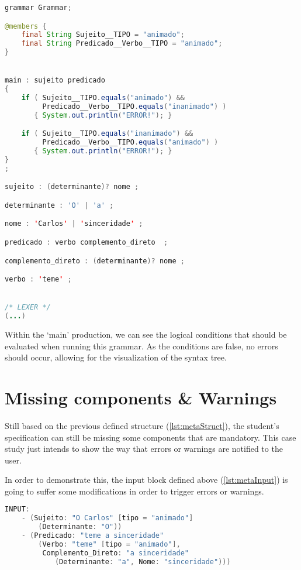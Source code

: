 \begin{center}
\begin{minipage}{13cm}
\begin{lstlisting}[language=java, basicstyle=\small, label={lst:case_study_sentence}, caption=Example of a specific generated grammar.]
grammar Grammar;

@members {
    final String Sujeito__TIPO = "animado";
    final String Predicado__Verbo__TIPO = "animado";
}


main : sujeito predicado
{
    if ( Sujeito__TIPO.equals("animado") &&
         Predicado__Verbo__TIPO.equals("inanimado") ) 
       { System.out.println("ERROR!"); }

    if ( Sujeito__TIPO.equals("inanimado") &&
         Predicado__Verbo__TIPO.equals("animado") ) 
       { System.out.println("ERROR!"); }
}
;

sujeito : (determinante)? nome ;

determinante : 'O' | 'a' ;

nome : 'Carlos' | 'sinceridade' ;

predicado : verbo complemento_direto  ;

complemento_direto : (determinante)? nome ;

verbo : 'teme' ;


/* LEXER */
(...)
\end{lstlisting}
\end{minipage}
\end{center}

Within the ‘main’ production, we can see the logical conditions that should be evaluated when running this grammar. As the conditions are false, no errors should occur,
allowing for the visualization of the syntax tree.



\section{Missing components \& Warnings}
Still based on the previous defined structure (\autoref{lst:metaStruct}), the student's specification can still be missing some components that are mandatory. 
This case study just intends to show the way that errors or warnings are notified to the user.

In order to demonstrate this, the input block defined above (\autoref{lst:metaInput}) is going to suffer some modifications in order to trigger errors or warnings.

\begin{center}
\begin{minipage}{12cm}
\begin{lstlisting}[language=java, basicstyle=\small, label={lst:meta_input_missing_comp}, caption=Example of the students parsing with missing component]
INPUT:
    - (Sujeito: "O Carlos" [tipo = "animado"]
        (Determinante: "O"))
    - (Predicado: "teme a sinceridade" 
        (Verbo: "teme" [tipo = "animado"], 
         Complemento_Direto: "a sinceridade" 
            (Determinante: "a", Nome: "sinceridade")))
\end{lstlisting}
\end{minipage}
\end{center}

